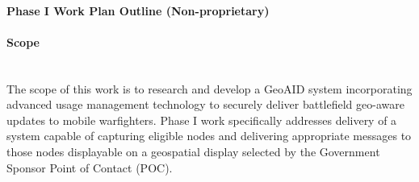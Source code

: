\documentclass{sbir}
\begin{document}
\newpage 
\lfoot{}
\cfoot{\color{LeTigre}\vspace*{-1.25em}{\scshape\fromproposaltitle}~\\ \rm\thepage}

\paragraph{Phase I Work Plan Outline (Non-proprietary)}
\paragraph{Scope}~\\
The scope of this work is to research and develop a GeoAID system incorporating advanced usage management technology to securely deliver battlefield geo-aware updates to mobile warfighters. Phase I work specifically addresses delivery of a system capable of capturing eligible nodes and delivering appropriate messages to those nodes displayable on a geospatial display selected by the Government Sponsor Point of Contact (POC). %
\end{document}
